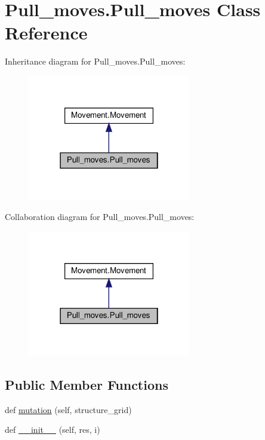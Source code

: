 \hypertarget{classPull__moves_1_1Pull__moves}{}\section{Pull\+\_\+moves.\+Pull\+\_\+moves Class Reference}
\label{classPull__moves_1_1Pull__moves}


Inheritance diagram for Pull\+\_\+moves.\+Pull\+\_\+moves\+:
\nopagebreak
\begin{figure}[H]
\begin{center}
\leavevmode
\includegraphics[width=202pt]{classPull__moves_1_1Pull__moves__inherit__graph}
\end{center}
\end{figure}


Collaboration diagram for Pull\+\_\+moves.\+Pull\+\_\+moves\+:
\nopagebreak
\begin{figure}[H]
\begin{center}
\leavevmode
\includegraphics[width=202pt]{classPull__moves_1_1Pull__moves__coll__graph}
\end{center}
\end{figure}
\subsection*{Public Member Functions}
\begin{DoxyCompactItemize}
\item 
def \hyperlink{classPull__moves_1_1Pull__moves_a58ef6f3a1397cc435cd186513562f0a5}{mutation} (self, structure\+\_\+grid)
\item 
def \hyperlink{classPull__moves_1_1Pull__moves_a6456567c18974da96c3c8bbbca78b989}{\+\_\+\+\_\+init\+\_\+\+\_\+} (self, res, i)
\end{DoxyCompactItemize}
